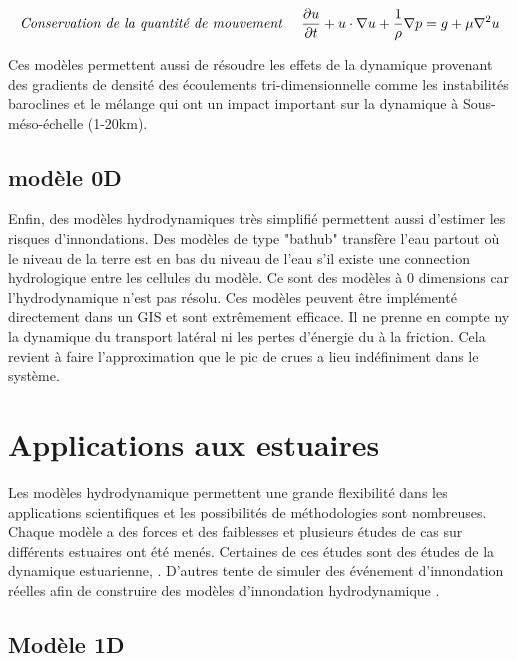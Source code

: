 \documentclass[12pt]{article}   %
\begin{document}
    \begin{align}
        \textit{Conservation de la quantité de mouvement \quad} \frac{\partial u}{\partial t} + u\cdot \nabla u + \frac{1}{\rho} \nabla p = g + \mu \nabla^2 u
    \end{align}
    
    Ces modèles permettent aussi de résoudre les effets de la dynamique provenant des gradients de densité des écoulements tri-dimensionnelle comme les instabilités baroclines et le mélange qui ont un impact important sur la dynamique à  Sous-méso-échelle (1-20km). 
    
    \subsection{modèle 0D}
    
    Enfin, des modèles hydrodynamiques très simplifié permettent aussi d'estimer les risques d'innondations. Des modèles de type "bathub" transfère l'eau partout où le niveau de la terre est en bas du niveau de l'eau s'il existe une connection hydrologique entre les cellules du modèle. Ce sont des modèles à 0 dimensions car l'hydrodynamique n'est pas résolu. Ces modèles peuvent être implémenté directement dans un GIS et sont extrêmement efficace. Il ne prenne en compte ny la dynamique du transport latéral ni les pertes d'énergie du à la friction. Cela revient à faire l'approximation que le pic de crues a lieu indéfiniment dans le système.
    
    \section{Applications aux estuaires}
    
    Les modèles hydrodynamique permettent une grande flexibilité dans les applications scientifiques et les possibilités de méthodologies sont nombreuses. Chaque modèle a des forces et des faiblesses et plusieurs études de cas sur différents estuaires ont été menés. Certaines de ces études sont des études de la dynamique estuarienne,\cite{Twigt2009,Spearman1998, Yang2012, Hein2011,Du2018, Kumbier20182} . D'autres tente de simuler des événement d'innondation réelles afin de construire des modèles d'innondation hydrodynamique \cite{Lee2019, martyr2013, Kumbier2019, Kumbier2018}.  

    \subsection{Modèle 1D}
\end{document}
